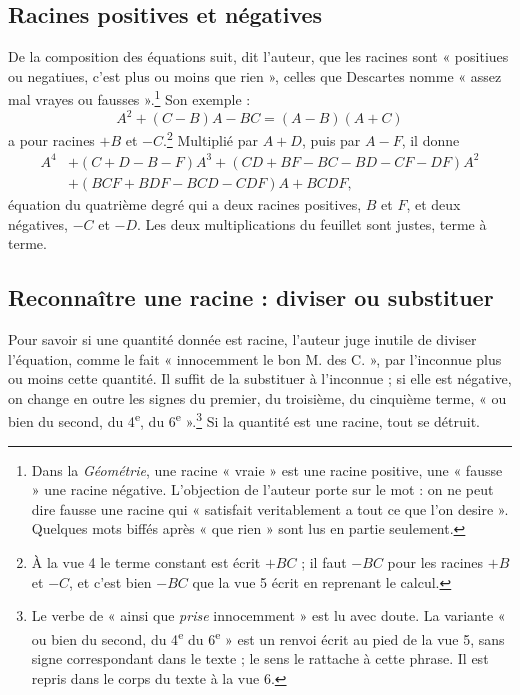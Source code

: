 \documentclass[11pt,a4paper]{article}
\begin{document}
\subsection*{Racines positives et négatives}

De la composition des équations suit, dit l'auteur, que les racines sont
« positiues ou negatiues, c'est plus ou moins que rien », celles que Descartes
nomme « assez mal vrayes ou fausses ».\footnote{Dans la \emph{Géométrie}, une
racine « vraie » est une racine positive, une « fausse » une racine négative.
L'objection de l'auteur porte sur le mot : on ne peut dire fausse une racine
qui « satisfait veritablement a tout ce que l'on desire ». Quelques mots biffés
après « que rien » sont lus en partie seulement.} Son exemple :
\[
A^2+(C-B)A-BC=(A-B)(A+C)
\]
a pour racines \(+B\) et \(-C\).\footnote{À la vue 4 le terme constant est écrit
\(+BC\) ; il faut \(-BC\) pour les racines \(+B\) et \(-C\), et c'est bien
\(-BC\) que la vue 5 écrit en reprenant le calcul.} Multiplié par \(A+D\), puis
par \(A-F\), il donne
\begin{align*}
A^4&+(C+D-B-F)A^3+(CD+BF-BC-BD-CF-DF)A^2\\
&+(BCF+BDF-BCD-CDF)A+BCDF ,
\end{align*}
équation du quatrième degré qui a deux racines positives, \(B\) et \(F\), et
deux négatives, \(-C\) et \(-D\). Les deux multiplications du feuillet sont
justes, terme à terme.

\subsection*{Reconnaître une racine : diviser ou substituer}

Pour savoir si une quantité donnée est racine, l'auteur juge inutile de
diviser l'équation, comme le fait « innocemment le bon M. des C. », par
l'inconnue plus ou moins cette quantité. Il suffit de la substituer à
l'inconnue ; si elle est négative, on change en outre les signes du premier, du
troisième, du cinquième terme, « ou bien du second, du 4\textsuperscript{e}, du
6\textsuperscript{e} ».\footnote{Le verbe de « ainsi que \emph{prise}
innocemment » est lu avec doute. La variante « ou bien du second, du
4\textsuperscript{e} du 6\textsuperscript{e} » est un renvoi écrit au pied de la
vue 5, sans signe correspondant dans le texte ; le sens le rattache à cette
phrase. Il est repris dans le corps du texte à la vue 6.} Si la quantité est
une racine, tout se détruit.
\end{document}
